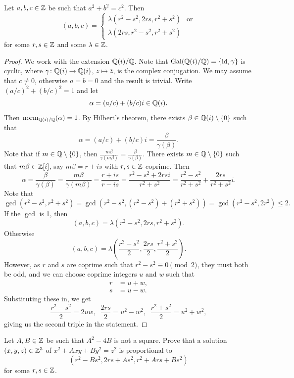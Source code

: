 \lecture

\begin{corollary}
    Let $a,b,c\in \mathbb{Z}$ be such that $a^2+b^2=c^2$. Then 
    \[
    (a,b,c)= \begin{cases} \lambda(r^2-s^2,2rs,r^2+s^2) & \text{or}\\ \lambda(2rs,r^2-s^2,r^2+s^2)\end{cases}
    \]
    for some $r,s\in\mathbb{Z}$ and some $\lambda\in\mathbb{Z}$.
\end{corollary}

\begin{proof}
    We work with the extension $\mathbb{Q}(i)/\mathbb{Q}$. Note that 
    $\operatorname{Gal}(\mathbb{Q}(i)/\mathbb{Q})=\{\operatorname{id},\gamma\}$ is cyclic, where 
    $\gamma\colon\mathbb{Q}(i)\to\mathbb{Q}(i)$, $z\mapsto\overline{z}$, is the complex conjugation. 
    We may assume that $c\ne 0$, otherwise $a=b=0$ and the result is trivial.  
    Write $(a/c)^2+(b/c)^2=1$ and let 
    \[
    \alpha=(a/c)+(b/c)i\in\mathbb{Q}(i).
    \]
    Then
    $\operatorname{norm}_{\mathbb{Q}(i)/\mathbb{Q}}(\alpha)=1$. 
    By Hilbert's theorem, 
    there exists $\beta\in\mathbb{Q}(i)\setminus\{0\}$ such that 
    \[
    \alpha=(a/c)+(b/c)i=\frac{\beta}{\gamma(\beta)}.
    \]
    Note that if $m\in\mathbb{Q}\setminus\{0\}$, then 
    $\frac{m\beta}{\gamma(m\beta)}=\frac{\beta}{\gamma(\beta)}$. 
    There exists $m\in\mathbb{Q}\setminus\{0\}$ such that 
    $m\beta\in\mathbb{Z}[i]$, say $m\beta=r+is$ with $r,s\in\mathbb{Z}$ coprime. Then
    \[
    \alpha=\frac{\beta}{\gamma(\beta)}=\frac{m\beta}{\gamma(m\beta)}=
    \frac{r+is}{r-is}=\frac{r^2-s^2+2rsi}{r^2+s^2}=\frac{r^2-s^2}{r^2+s^2}+\frac{2rs}{r^2+s^2}i.
    \]
    Note that
    \[\gcd(r^2-s^2,r^2+s^2)=\gcd(r^2-s^2,(r^2-s^2)+(r^2+s^2))=\gcd(r^2-s^2,2r^2) \leq 2.\]
    If the $\gcd$ is 1, then
    \[(a,b,c)=\lambda(r^2-s^2,2rs,r^2+s^2).\]
    Otherwise
    \[(a,b,c)=\lambda\left(\frac{r^2-s^2}{2},\frac{2rs}{2},\frac{r^2+s^2}{2}\right).\]
    However, as $r$ and $s$ are coprime such that $r^2-s^2 \equiv 0 \pmod2$, they must both be odd, and we can choose coprime integers $u$ and $w$ such that
    \begin{align*}
    r &= u+w,\\
    s &= u-w.
\end{align*}
Substituting these in, we get
\[\frac{r^2-s^2}{2}=2uw, \;\; \frac{2rs}{2}=u^2-w^2, \;\; \frac{r^2+s^2}{2}=u^2+w^2,\]
giving us the second triple in the statement.
\end{proof}

\begin{exercise}
Let $A,B\in\mathbb{Z}$ be such that $A^2-4B$ is not a square. Prove that 
a solution $(x,y,z)\in\mathbb{Z}^3$ of $x^2 + Axy + By^2 = z^2$
is proportional to 
\[
(r^2-Bs^2,2rs+As^2,r^2+Ars+Bs^2)
\]
for some $r,s\in\mathbb{Z}$.
\end{exercise}


